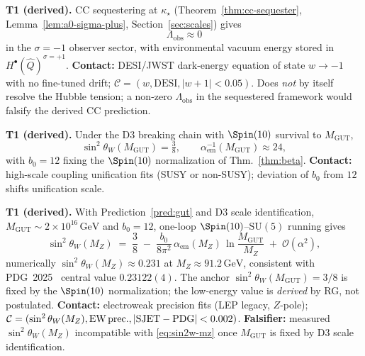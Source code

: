 \begin{prediction}\label{pred:cc}
\textbf{T1 (derived).} CC sequestering at $\kappa_\star$
(Theorem~\ref{thm:cc-sequester}, Lemma~\ref{lem:a0-sigma-plus},
Section~\ref{sec:scales}) gives
\begin{equation}\label{eq:Lambda-obs}
  \Lambda_{\mathrm{obs}}\approx 0
\end{equation}
in the $\sigma=-1$ observer sector, with environmental vacuum energy stored in
$H^\bullet(\hat Q)^{\sigma=+1}$.
\textbf{Contact:} DESI/JWST dark-energy equation of state
$w\to -1$ with no fine-tuned drift; $\mathcal{C}=(w,\mathrm{DESI},|w+1|<0.05)$.
Does \emph{not} by itself resolve the Hubble tension; a non-zero
$\Lambda_{\mathrm{obs}}$ in the sequestered framework would falsify the
derived CC prediction.
\end{prediction}

\begin{prediction}\label{pred:gut}
\textbf{T1 (derived).} Under the D3 breaking chain with $\Spin(10)$ survival
to $M_{\mathrm{GUT}}$,
\begin{equation}\label{eq:sin2w}
  \sin^2\theta_W(M_{\mathrm{GUT}})=\tfrac38,
  \qquad
  \alpha_{\mathrm{em}}^{-1}(M_{\mathrm{GUT}})\approx 24,
\end{equation}
with $b_0=12$ fixing the $\Spin(10)$ normalization of Thm.~\ref{thm:beta}.
\textbf{Contact:} high-scale coupling unification fits (SUSY or non-SUSY);
deviation of $b_0$ from $12$ shifts unification scale.
\end{prediction}

\begin{prediction}\label{pred:sin2w-mz}
\textbf{T1 (derived).} With Prediction~\ref{pred:gut} and D3 scale identification,
$M_{\mathrm{GUT}}\sim 2\times 10^{16}\,\mathrm{GeV}$ and $b_0=12$, one-loop
$\Spin(10)$--$\mathrm{SU}(5)$ running gives
\begin{equation}\label{eq:sin2w-mz}
  \sin^2\theta_W(M_Z)
  \;=\;
  \frac38
  \;-\;
  \frac{b_0}{8\pi^2}\,\alpha_{\mathrm{em}}(M_Z)\,
  \ln\!\frac{M_{\mathrm{GUT}}}{M_Z}
  \;+\;\mathcal{O}(\alpha^2),
\end{equation}
numerically $\sin^2\theta_W(M_Z)\approx 0.231$ at $M_Z\approx 91.2\,\mathrm{GeV}$,
consistent with PDG~2025~\cite{PDG2025} central value
$0.23122(4)$. The anchor $\sin^2\theta_W(M_{\mathrm{GUT}})=3/8$ is fixed by
the $\Spin(10)$ normalization; the low-energy value is \emph{derived} by RG,
not postulated.
\textbf{Contact:} electroweak precision fits (LEP legacy, $Z$-pole);
$\mathcal{C}=(\sin^2\theta_W(M_Z),\mathrm{EW\,prec.},|{\rm SJET}-{\rm PDG}|<0.002)$.
\textbf{Falsifier:} measured $\sin^2\theta_W(M_Z)$ incompatible with
\eqref{eq:sin2w-mz} once $M_{\mathrm{GUT}}$ is fixed by D3 scale identification.
\end{prediction}

